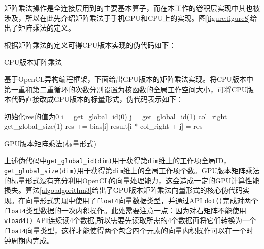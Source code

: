 矩阵乘法操作是全连接层用到的主要基本算子，而在本工作的卷积层实现中其也被涉及，所以在此先介绍矩阵乘法于手机GPU和CPU上的实现。图\ref{figure:figure8}给出了矩阵乘法的定义。

根据矩阵乘法的定义可得CPU版本实现的伪代码如下：

\begin{algorithm}[htbp]
  \small
  \SetAlgoLined
    \begin{spacing}{0.9}
    \end{spacing}
  \caption{CPU版本矩阵乘法}
  \label{algo:algorithm1}
\end{algorithm}

基于OpenCL异构编程框架，下面给出GPU版本的矩阵乘法实现。将CPU版本中第一重和第二重循环的次数分别设置为核函数的全局工作空间大小，可将CPU版本代码直接改成GPU版本的标量形式，伪代码表示如下：

\begin{algorithm}[htbp]
  \small
  \SetAlgoLined
    \begin{spacing}{0.9}
    初始化res的值为0\;
  i = get\_global\_id(0)\;
  j = get\_global\_id(1)\;
  col\_right = get\_global\_size(1)\;
    res += bias[i]\;
  result[i * col\_right + j] = res\;
    \end{spacing}
  \caption{GPU版本矩阵乘法(标量形式)}
  \label{algo:algorithm2}
\end{algorithm}

上述伪代码中\texttt{get\_global\_id(dim)}用于获得第\texttt{dim}维上的工作项全局ID，\texttt{get\_global\_size(dim)}用于获得第\texttt{dim}维上的全局工作项个数。GPU版本矩阵乘法的标量形式没有充分利用OpenCL的向量处理能力，这会造成一定的GPU计算性能损失。算法\ref{algo:algorithm3}给出了GPU版本矩阵乘法向量形式的核心伪代码实现。在向量形式实现中使用了\texttt{float4}向量数据类型，并通过API \texttt{dot()}完成对两个\texttt{float4}类型数据的一次内积操作。此处需要注意一点：因为对右矩阵不能使用\texttt{vload4()} API连续读4个数据,所以需要先读取所需的4个数据再将它们转换为一个\texttt{float4}向量类型，这样才能使得两个包含四个元素的向量内积操作可以在一个时钟周期内完成。

